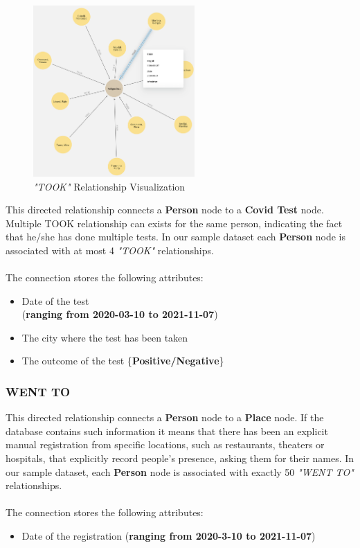 \documentclass{article}[IEEEtran]
\begin{document}
\begin{figure}
\vspace{-1.5cm}
\begin{center}
\includegraphics[width=0.55\textwidth, frame]{TOOK.png}
\caption{\emph{"TOOK"} Relationship Visualization}
\end{center}
\end{figure}

This directed relationship connects a \textbf{Person} node to a \textbf{Covid Test} node. Multiple TOOK relationship can exists for the same person, indicating the fact that he/she has done multiple tests. In our sample dataset each \textbf{Person} node is associated with at most 4 \emph{"TOOK"} relationships.
\\\\
The connection stores the following attributes:
\begin{itemize}
    \item Date of the test \\ (\textbf{ranging from 2020-03-10 to 2021-11-07})
    \item The city where the test has been taken
    \item The outcome of the test \{\textbf{Positive/Negative}\}
\end{itemize}

\newpage

\subsubsection{WENT TO}

This directed relationship connects a \textbf{Person} node to a \textbf{Place} node.
If the database contains such information it means that there has been an explicit manual registration from specific locations, such as restaurants, theaters or hospitals, that explicitly record people’s presence, asking them for their names. In our sample dataset, each \textbf{Person} node is associated with exactly 50 \emph{"WENT TO"} \\ relationships.
\\\\
The connection stores the following attributes:
\begin{itemize}
\item Date of the registration (\textbf{ranging from 2020-3-10 to 2021-11-07})
\end{itemize}
\end{document}
